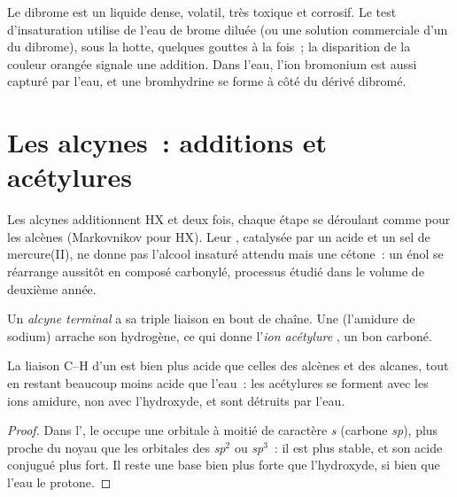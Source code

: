\begin{inthelab}
Le dibrome est un liquide dense, volatil, très toxique et corrosif. Le
test d'insaturation utilise de l'eau de brome diluée (ou une solution
commerciale d'un  du dibrome), sous la hotte, quelques gouttes à
la fois~; la disparition de la couleur orangée signale une addition.
Dans l'eau, l'ion bromonium est aussi capturé par l'eau, et une
bromhydrine se forme à côté du dérivé dibromé.
\end{inthelab}

\section{Les alcynes~: additions et acétylures}

Les alcynes additionnent HX et  deux fois, chaque étape se
déroulant comme pour les alcènes (Markovnikov pour HX). Leur ,
catalysée par un acide et un sel de mercure(II), ne donne pas l'alcool
insaturé attendu mais une cétone~: un énol se réarrange aussitôt en
composé carbonylé, processus étudié dans le volume de deuxième année.

\begin{definition}\label{def:b1:electrophilic-additions:acetylide}
Un \emph{alcyne terminal}  a sa
triple liaison en bout de chaîne. Une  (l'amidure de sodium)
arrache son hydrogène, ce qui donne l'\emph{ion acétylure}
, un bon  carboné.
\end{definition}

\begin{proposition}\label{prop:b1:electrophilic-additions:acetylide-acidity}
La liaison C--H d'un  est bien plus acide que celles des
alcènes et des alcanes, tout en restant beaucoup moins acide que l'eau~:
les acétylures se forment avec les ions amidure, non avec l'hydroxyde,
et sont détruits par l'eau.
\end{proposition}

\begin{proof}
Dans l', le  occupe une orbitale à moitié
de caractère \textit{s} (carbone \textit{sp}), plus proche du noyau que
les orbitales des  \textit{sp}$^2$ ou \textit{sp}$^3$~: il est
plus stable, et son acide conjugué plus fort. Il reste une base bien plus
forte que l'hydroxyde, si bien que l'eau le protone.
\end{proof}

